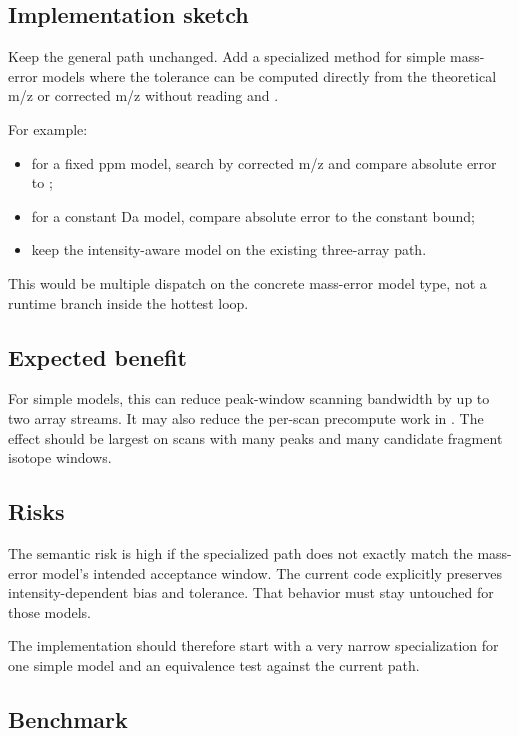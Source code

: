 \documentclass[11pt]{article}
\begin{document}
\subsection*{Implementation sketch}

Keep the general path unchanged. Add a specialized method for simple mass-error
models where the tolerance can be computed directly from the theoretical m/z or
corrected m/z without reading  and .

For example:

\begin{itemize}
  \item for a fixed ppm model, search by corrected m/z and compare absolute
        error to ;
  \item for a constant Da model, compare absolute error to the constant bound;
  \item keep the intensity-aware model on the existing three-array path.
\end{itemize}

This would be multiple dispatch on the concrete mass-error model type, not a
runtime branch inside the hottest loop.

\subsection*{Expected benefit}

For simple models, this can reduce peak-window scanning bandwidth by up to two
array streams. It may also reduce the per-scan precompute work in
. The effect should be largest on scans with many
peaks and many candidate fragment isotope windows.

\subsection*{Risks}

The semantic risk is high if the specialized path does not exactly match the
mass-error model's intended acceptance window. The current code explicitly
preserves intensity-dependent bias and tolerance. That behavior must stay
untouched for those models.

The implementation should therefore start with a very narrow specialization for
one simple model and an equivalence test against the current path.

\subsection*{Benchmark}
\end{document}
